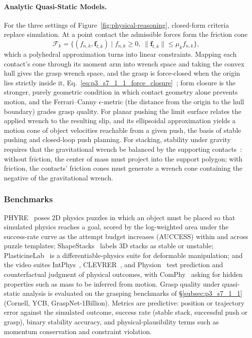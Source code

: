 \paragraph{Analytic Quasi-Static Models.}
For the three settings of Figure~\ref{fig:physical-reasoning}, closed-form criteria replace simulation. At a point contact the admissible forces form the friction cone
\begin{equation}
\mathcal{F}_k = \{(f_{n,k},\mathbf{f}_{t,k}) \mid f_{n,k} \ge 0, \ \|\mathbf{f}_{t,k}\|\le \mu_k f_{n,k}\},
\end{equation}
which a polyhedral approximation turns into linear constraints. Mapping each contact's cone through its moment arm into wrench space and taking the convex hull gives the grasp wrench space, and the grasp is force-closed when the origin lies strictly inside it, Eq.~\eqref{eq:p3_s7_1_1_force_closure}~\cite{bicchi2000robotic}; form closure is the stronger, purely geometric condition in which contact geometry alone prevents motion, and the Ferrari--Canny $\epsilon$-metric (the distance from the origin to the hull boundary) grades grasp quality. For planar pushing the limit surface relates the applied wrench to the resulting slip, and its ellipsoidal approximation yields a motion cone of object velocities reachable from a given push, the basis of stable pushing and closed-loop push planning. For stacking, stability under gravity requires that the gravitational wrench be balanced by the supporting contacts~\cite{groth2018shapestacks}: without friction, the center of mass must project into the support polygon; with friction, the contacts' friction cones must generate a wrench cone containing the negative of the gravitational wrench.

\subsubsection{Benchmarks}
PHYRE~\cite{bakhtin2019phyre} poses 2D physics puzzles in which an object must be placed so that simulated physics reaches a goal, scored by the log-weighted area under the success-rate curve as the attempt budget increases (AUCCESS) within and across puzzle templates; ShapeStacks~\cite{groth2018shapestacks} labels 3D stacks as stable or unstable; PlasticineLab~\cite{huang2021plasticinelab} is a differentiable-physics suite for deformable manipulation; and the video suites IntPhys~\cite{riochet2018intphys}, CLEVRER~\cite{Yi2020CLEVRER}, and Physion~\cite{Bear2021Physion} test prediction and counterfactual judgment of physical outcomes, with ComPhy~\cite{chen2022comphy} asking for hidden properties such as mass to be inferred from motion. Grasp quality under quasi-static analysis is evaluated on the grasping benchmarks of §\ref{subsec:p3_s7_1_1} (Cornell, YCB, GraspNet-1Billion). Metrics are predictive: position or trajectory error against the simulated outcome, success rate (stable stack, successful push or grasp), binary stability accuracy, and physical-plausibility terms such as momentum conservation and constraint violation.

